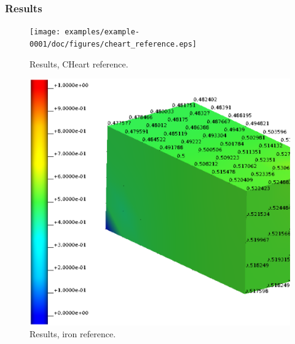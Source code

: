 \subsubsection{Results}
%
%
%


%
\begin{figure}[h!]
    \centering 
    \texttt{[image: examples/example-0001/doc/figures/cheart\_reference.eps]} 
    \caption{Results, CHeart reference.}
    \label{example-0001-cheart-reference-fig}
\end{figure}
%
\begin{figure}[h!]
    \centering 
    \includegraphics[width=0.9\columnwidth]{examples/example-0001/doc/figures/iron_reference.eps} 
    \caption{Results, iron reference.}
    \label{example-0001-iron-reference-fig}
\end{figure}
%
